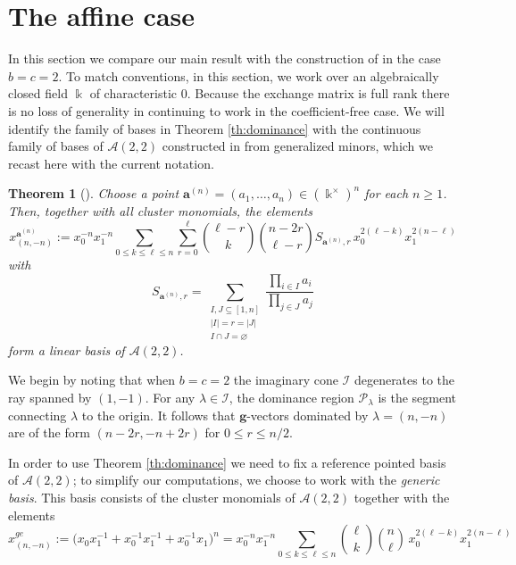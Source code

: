 \documentclass{amsart}
\newtheorem{theorem}{Theorem}
\numberwithin{theorem}{section}
\newcommand{\bfa}{\boldsymbol{a}}
\newcommand{\bfg}{\boldsymbol{g}}
\newcommand{\cA}{\mathcal{A}}
\newcommand{\cI}{\mathcal{I}}
\newcommand{\cP}{\mathcal{P}}
\newcommand{\kk}{\Bbbk}
\begin{document}
\section{The affine case}
\label{sec:affine}

  In this section we compare our main result with the construction of \cite{RSW19} in the case $b=c=2$.
  To match conventions, in this section, we work over an algebraically closed field $\kk$ of characteristic 0.
  Because the exchange matrix is full rank there is no loss of generality in continuing to work in the coefficient-free case.
  We will identify the family of bases in Theorem \ref{th:dominance} with the continuous family of bases of $\cA(2,2)$ constructed in \cite{RSW19} from generalized minors, which we recast here with the current notation. 

  \begin{theorem}[{\cite[Theorem 4.6]{RSW19}}]
    \label{thm:rsw}
    Choose a point $\bfa^{(n)}=(a_1,\dots,a_n)\in(\kk^\times)^n$ for each $n\geq1$.
    Then, together with all cluster monomials, the elements 
    \begin{equation}
      \label{eq:generalized minor}
      x_{(n,-n)}^{\bfa^{(n)}}:= x_0^{-n} x_1^{-n} \sum_{0 \leq k \leq \ell \leq n} \sum\limits_{r=0}^\ell {\ell-r\choose k} {n-2r\choose \ell-r} S_{\bfa^{(n)},r}  \, x_0^{2(\ell-k)} x_1^{2(n-\ell)}
    \end{equation}
    with
    \[
      S_{\bfa^{(n)},r}=\sum\limits_{\substack{I,J\subseteq[1,n]\\|I|=r=|J|\\ I\cap J=\varnothing}}\frac{\prod_{i\in I} a_i}{\prod_{j\in J} a_j}
    \]
    form a linear basis of $\cA(2,2)$.
  \end{theorem}

  We begin by noting that when $b=c=2$ the imaginary cone $\cI$ degenerates to the ray spanned by $(1,-1)$.
  For any $\lambda\in\cI$, the dominance region $\cP_\lambda$ is the segment connecting $\lambda$ to the origin.
  It follows that $\bfg$-vectors dominated by $\lambda=(n,-n)$ are of the form $(n-2r,-n+2r)$ for $0\leq r \leq n/2$.

  In order to use Theorem \ref{th:dominance} we need to fix a reference pointed basis of $\cA(2,2)$; to simplify our computations, we choose to work with the \emph{generic basis}.
  This basis consists of the cluster monomials of $\cA(2,2)$ together with the elements
  \[
    x_{(n,-n)}^{ge}
    :=
		\Big(x_0 x_1^{-1} + x_0^{-1}x_1^{-1} + x_0^{-1}x_1\Big)^n
		=
    x_0^{-n} x_1^{-n}
    \sum_{0 \leq k \leq \ell \leq n}
    {\ell\choose k} {n\choose \ell}
    \, x_0^{2(\ell-k)} x_1^{2(n-\ell)}
  \]
\end{document}
